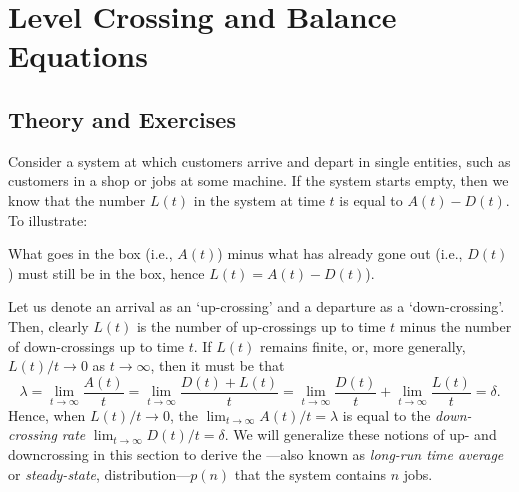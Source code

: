 \section{Level Crossing and Balance Equations}
\label{sec:level-cross-balance}


\subsection*{Theory and Exercises}



Consider a system at which customers arrive and depart in single
entities, such as customers in a shop or jobs at some machine.  If the
system starts empty, then we know that the number $L(t)$ in the system
at time $t$ is equal to $A(t) - D(t)$. To illustrate:

\begin{figure}[h]
  \centering
{}
\end{figure}

\noindent What goes in the box (i.e., $A(t)$) minus what has already gone out
  (i.e., $D(t)$) must still be in the box, hence $L(t)=A(t)-D(t)$). 



Let us denote an arrival as an `up-crossing' and a departure as a
`down-crossing'.  Then, clearly $L(t)$ is the number of up-crossings
up to time $t$ minus the number of down-crossings up to time $t$. If
$L(t)$ remains finite, or, more generally, $L(t)/t \to 0$ as $t\to\infty$, then it
must be that
\begin{equation*}
  \lambda =  \lim_{t \to \infty} \frac{A(t)}t  = \lim_{t \to \infty} \frac{D(t)+L(t)}t =  \lim_{t \to \infty} \frac{D(t)}t + \lim_{t \to \infty} \frac{L(t)}t 
  = \delta.  
\end{equation*}
Hence, when $L(t)/t\to0$, the 
$\lim_{t \to \infty} A(t)/t = \lambda$ is equal to the \emph{down-crossing rate}
$\lim_{t \to \infty} D(t)/t = \delta$.  We will generalize these notions of up- and
downcrossing in this section to derive the ---also known as \emph{long-run time average} or \emph{steady-state},
distribution---$p(n)$ that the system contains $n$ jobs. 

